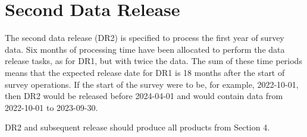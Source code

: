 \section{Second  Data Release } \label{sect:dr2}

The second data release (DR2) is specified to process the first year of survey data.
Six months of processing time have been allocated to perform the data release tasks, as for DR1, but with twice the data. 
The sum of these time periods means that the expected release date for DR1 is 18 months after the start of survey operations.       
If the start of the survey were to be, for example, 2022-10-01, then DR2 would be released before 2024-04-01 and would contain data from 2022-10-01 to 2023-09-30.

DR2 and subsequent release should produce all products from \DPDD Section 4.
